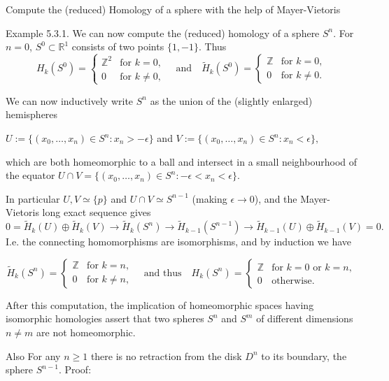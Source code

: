 Compute the (reduced) Homology of a sphere with the help of Mayer-Vietoris

Example 5.3.1. We can now compute the (reduced) homology of a sphere \(S^n\). For \(n = 0\), \(S^0 \subset \mathbb{R}^1\) consists of two points \(\{1, -1\}\). Thus 
\[H_k(S^0) = \begin{cases}
\mathbb{Z}^2 & \text{for } k = 0, \\
0 & \text{for } k \neq 0,
\end{cases} \quad \text{and} \quad \tilde{H}_k(S^0) = \begin{cases}
\mathbb{Z} & \text{for } k = 0, \\
0 & \text{for } k \neq 0.
\end{cases}\]

We can now inductively write \(S^n\) as the union of the (slightly enlarged) hemispheres

\(U := \{(x_0, \dots, x_n) \in S^n : x_n > -\epsilon\}\)
and 
\(V := \{(x_0, \dots, x_n) \in S^n : x_n < \epsilon\},\)

which are both homeomorphic to a ball and intersect in a small neighbourhood of the equator
\(U \cap V = \{(x_0, \dots, x_n) \in S^n : -\epsilon < x_n < \epsilon\}.\)

In particular \(U, V \simeq \{p\}\) and \(U \cap V \simeq S^{n-1}\) (making \(\epsilon \to 0\)), and the Mayer-Vietoris long exact sequence gives
\(0 = \tilde{H}_k(U) \oplus \tilde{H}_k(V) \to \tilde{H}_k(S^n) \to \tilde{H}_{k-1}(S^{n-1}) \to \tilde{H}_{k-1}(U) \oplus \tilde{H}_{k-1}(V) = 0.\)
I.e. the connecting homomorphisms are isomorphisms, and by induction we have

\[\tilde{H}_k(S^n) = \begin{cases}
\mathbb{Z} & \text{for } k = n, \\
0 & \text{for } k \neq n,
\end{cases} \quad \text{and thus} \quad H_k(S^n) = \begin{cases}
\mathbb{Z} & \text{for } k = 0 \text{ or } k = n, \\
0 & \text{otherwise.}
\end{cases}\]

After this computation, the implication of homeomorphic spaces having isomorphic homologies assert that 
two spheres \(S^n\) and \(S^m\) of different dimensions \(n \neq m\) are not homeomorphic.

Also
For any \(n \geq 1\) there is no retraction from the disk \(D^n\) to its boundary, the sphere \(S^{n-1}\).
Proof: 

